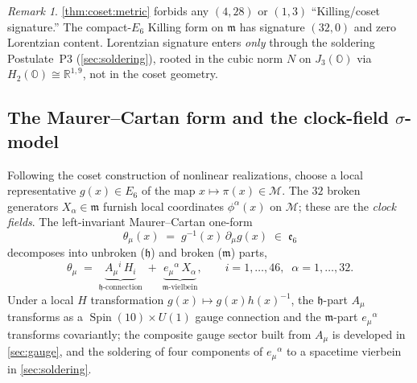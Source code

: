 \documentclass[11pt]{article}
\theoremstyle{plain}
\theoremstyle{definition}
\theoremstyle{remark}
\newtheorem{remark}[theorem]{Remark}
\newcommand{\Spin}{\operatorname{Spin}}
\begin{document}
\begin{remark}\label{rem:coset:nolorentz}
\autoref{thm:coset:metric} forbids any $(4,28)$ or $(1,3)$ ``Killing/coset
signature.'' The compact-$E_{6}$ Killing form on $\mathfrak m$ has signature
$(32,0)$ and zero Lorentzian content. Lorentzian signature enters \emph{only}
through the soldering Postulate~P3 (\autoref{sec:soldering}), rooted in the cubic
norm $N$ on $J_{3}(\mathbb O)$ via $H_{2}(\mathbb O)\cong\mathbb R^{1,9}$, not in
the coset geometry.
\end{remark}

\subsection{The Maurer--Cartan form and the clock-field \texorpdfstring{$\sigma$}{sigma}-model}
\label{sec:coset:sigma}
\label{sec:sigma}

Following the coset construction of nonlinear realizations, choose a local
representative $g(x)\in E_{6}$ of the map $x\mapsto\pi(x)\in\mathcal M$. The
$32$ broken generators $X_{\alpha}\in\mathfrak m$ furnish local coordinates
$\phi^{\alpha}(x)$ on $\mathcal M$; these are the \emph{clock fields}. The
left-invariant Maurer--Cartan one-form
\begin{equation}\label{eq:coset:MC}
  \theta_{\mu}(x) \;=\; g^{-1}(x)\,\partial_{\mu}g(x)\;\in\;\mathfrak e_{6}
\end{equation}
decomposes into unbroken ($\mathfrak h$) and broken ($\mathfrak m$) parts,
\begin{equation}\label{eq:coset:MCsplit}
  \theta_{\mu}
   \;=\; \underbrace{A_{\mu}{}^{i}\,H_{i}}_{\mathfrak h\text{-connection}}
        \;+\;
         \underbrace{e_{\mu}{}^{\alpha}\,X_{\alpha}}_{\mathfrak m\text{-vielbein}},
  \qquad i = 1,\dots,46,\;\; \alpha = 1,\dots,32 .
\end{equation}
Under a local $H$ transformation $g(x)\mapsto g(x)h(x)^{-1}$, the $\mathfrak
h$-part $A_{\mu}$ transforms as a $\Spin(10)\times U(1)$ gauge connection and the
$\mathfrak m$-part $e_{\mu}{}^{\alpha}$ transforms covariantly; the composite
gauge sector built from $A_{\mu}$ is developed in \autoref{sec:gauge}, and the
soldering of four components of $e_{\mu}{}^{\alpha}$ to a spacetime vierbein in
\autoref{sec:soldering}.
\end{document}
